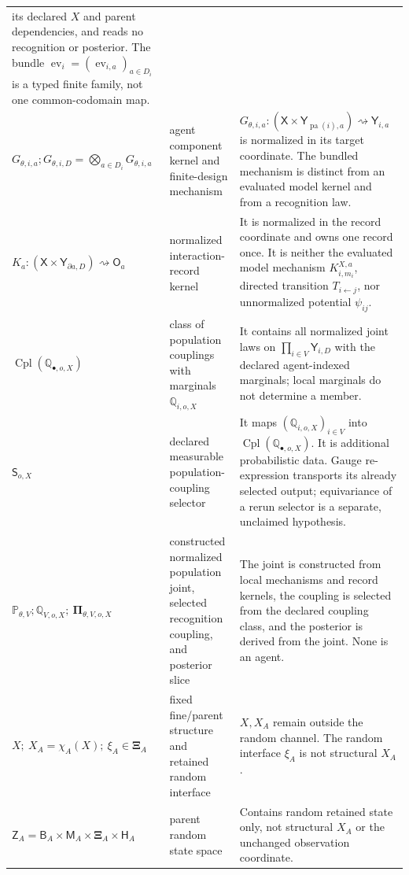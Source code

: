 \begin{longtable}{@{}>{\raggedright\arraybackslash}p{}
>{\raggedright\arraybackslash}p{}
>{\raggedright\arraybackslash}p{}@{}}
its declared \(X\) and parent dependencies, and reads no recognition or posterior.
The bundle \(\operatorname{ev}_i=(\operatorname{ev}_{i,a})_{a\in D_i}\) is a
typed finite family, not one common-codomain map. \\
\(G_{\theta,i,a}; G_{\theta,i,D}=\bigotimes_{a\in D_i}G_{\theta,i,a}\) &
agent component kernel and finite-design mechanism &
\(G_{\theta,i,a}:(\mathsf X\times\mathsf Y_{\operatorname{pa}(i),a})
\rightsquigarrow\mathsf Y_{i,a}\) is normalized in its target coordinate. The bundled
mechanism is distinct from an evaluated model kernel and from a recognition law. \\
\(K_a:(\mathsf X\times\mathsf Y_{\partial a,D})\rightsquigarrow\mathsf O_a\) &
normalized interaction-record kernel &
It is normalized in the record coordinate and owns one record once. It is neither the
evaluated model mechanism \(K^{X,a}_{i,m_i}\), directed transition \(T_{i\leftarrow j}\), nor
unnormalized potential \(\psi_{ij}\). \\
\(\operatorname{Cpl}(\mathbb Q_{\bullet,o,X})\) &
class of population couplings with marginals \(\mathbb Q_{i,o,X}\) &
It contains all normalized joint laws on \(\prod_{i\in V}\mathsf Y_{i,D}\) with the declared
agent-indexed marginals; local marginals do not determine a member. \\
\(\mathsf S_{o,X}\) &
declared measurable population-coupling selector &
It maps \((\mathbb Q_{i,o,X})_{i\in V}\) into
\(\operatorname{Cpl}(\mathbb Q_{\bullet,o,X})\). It is additional probabilistic
data. Gauge re-expression transports its already selected output; equivariance
of a rerun selector is a separate, unclaimed hypothesis. \\
\(\mathbb P_{\theta,V}; \mathbb Q_{V,o,X};\
\boldsymbol\Pi_{\theta,V,o,X}\) &
constructed normalized population joint, selected recognition coupling, and posterior slice &
The joint is constructed from local mechanisms and record kernels, the coupling is selected from
the declared coupling class, and the posterior is derived from the joint. None is an agent. \\
\(X;\ X_A=\chi_A(X);\ \xi_A\in\boldsymbol\Xi_A\) &
fixed fine/parent structure and retained random interface &
\(X,X_A\) remain outside the random channel. The random interface \(\xi_A\)
is not structural \(X_A\). \\
\(\mathsf Z_A=\mathsf B_A\times\mathsf M_A\times
\boldsymbol\Xi_A\times\mathsf H_A\) &
parent random state space &
Contains random retained state only, not structural \(X_A\) or the unchanged
observation coordinate. \\

\end{longtable}
